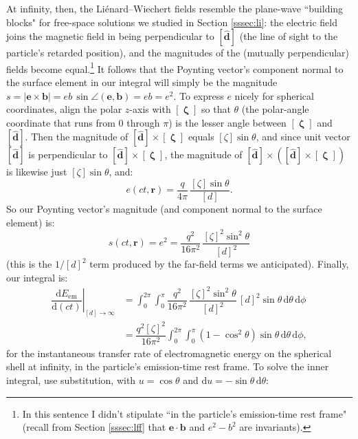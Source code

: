 \documentclass[12pt]{article}
\renewcommand{\vv}[1]{\mathbf{#1}}
\newcommand{\dd}[1]{\mathrm{d}#1}
\newcommand{\vvzeta}{\bm{\upzeta}}
\begin{document}
At infinity, then, the Li\'enard--Wiechert fields resemble the plane-wave ``building blocks" for free-space solutions we studied in Section \ref{sssec:li}: the electric field joins the magnetic field in being perpendicular to $[\vv{\hat{d}}]$ (the line of sight to the particle's retarded position), and the magnitudes of the (mutually perpendicular) fields become equal.\footnote{In this sentence I didn't stipulate ``in the particle's emission-time rest frame" (recall from Section \ref{sssec:lff} that $\vv e \cdot \vv b$ and $e^2 - b^2$ are invariants).} It follows that the Poynting vector's component normal to the surface element in our integral will simply be the magnitude $s = \vert \vv e \times \vv b \vert = eb \, \sin \angle (\vv e, \vv b) = eb = e^2$. To express $e$ nicely for spherical coordinates, align the polar $z$-axis with $[\vvzeta]$ so that $\theta$ (the polar-angle coordinate that runs from $0$ through $\pi$) is the lesser angle between $[\vvzeta]$ and $[\vv{\hat{d}}]$. Then the magnitude of $[\vv{\hat{d}}] \times [\vvzeta]$ equals $[\zeta] \sin \theta$, and since unit vector $[\vv{\hat{d}}]$ is perpendicular to $[\vv{\hat{d}}] \times [\vvzeta]$, the magnitude of $[\vv{\hat{d}}] \times ([\vv{\hat{d}}] \times [\vvzeta])$ is likewise just $[\zeta] \sin \theta$, and:
\begin{equation*}
e(ct, \vv r) = \dfrac{q}{4 \pi} \, \dfrac{[\zeta] \sin \theta}{[d]} .
\end{equation*}
So our Poynting vector's magnitude (and component normal to the surface element) is:
\begin{equation*}
s(ct, \vv r) = e^2 = \dfrac{q^2}{16 \pi^2} \, \dfrac{[\zeta]^2 \sin^2 \theta}{[d]^2}
\end{equation*}
(this is the $1 / [d]^2$ term produced by the far-field terms we anticipated). Finally, our integral is:
\begin{equation*}
\begin{aligned}
\left. \dfrac{\dd E_{\textrm{em}}}{\dd (ct)} \right|_{[d] \rightarrow \infty} &= \int_{0}^{2 \pi} \int_{0}^{\pi} \dfrac{q^2}{16 \pi^2} \, \dfrac{[\zeta]^2 \sin^2 \theta}{[d]^2} \, [d]^2 \sin \theta \, \dd \theta \, \dd \phi \\[3pt]
&= \dfrac{q^2 [\zeta]^2}{16 \pi^2} \int_{0}^{2 \pi} \int_{0}^{\pi} \left( 1 - \cos^2 \theta \right) \sin \theta \, \dd \theta \, \dd \phi ,
\end{aligned}
\end{equation*}
for the instantaneous transfer rate of electromagnetic energy on the spherical shell at infinity, in the particle's emission-time rest frame. To solve the inner integral, use substitution, with $u = \cos \theta$ and $\dd u = - \sin \theta \, \dd \theta$:
\end{document}
